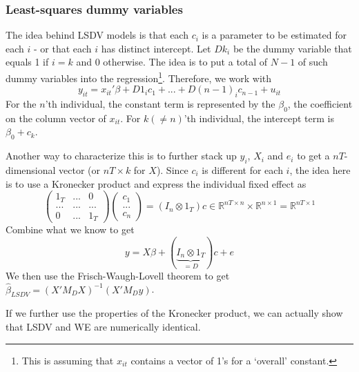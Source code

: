 \documentclass[12pt]{article}
\theoremstyle{definition}
\theoremstyle{property}
\theoremstyle{assumption}
\theoremstyle{example}
\theoremstyle{comment}
\begin{document}
\subsubsection{Least-squares dummy variables}
The idea behind LSDV models is that each $c_i$ is a parameter to be estimated for each $i$ - or that each $i$ has distinct intercept. Let $Dk_i$ be the dummy variable that equals 1 if $i=k$ and 0 otherwise. The idea is to put a total of $N-1$ of such dummy variables into the regression\footnote{This is assuming that $x_{it}$ contains a vector of 1's for a `overall' constant.}. Therefore, we work with
\small{\[
y_{it}=x_{it}'\beta + D1_ic_1+...+D(n-1)_ic_{n-1}+u_{it} 
\]}\normalsize
For the $n$'th individual, the constant term is represented by the $\beta_0$, the coefficient on the column vector of $x_{it}$. For $k(\neq n)$'th individual, the intercept term is $\beta_0 + c_k$. 
\par
Another way to characterize this is to further stack up $y_i$, $X_i$ and $e_i$ to get a $nT$-dimensional vector (or $nT\times k$ for $X$). Since $c_i$ is different for each $i$, the idea here is to use a Kronecker product and express the individual fixed effect as
\[
\begin{pmatrix}1_T &...& 0 \\ ... &...&...\\ 0&...& 1_T \end{pmatrix}\begin{pmatrix}c_1\\ ...\\ c_n \end{pmatrix}=(I_n\otimes 1_T)c\in\mathbb{R}^{nT\times n}\times \mathbb{R}^{n\times 1}=\mathbb{R}^{nT\times 1}
\]
Combine what we know to get 
\[
{y} = {X}\beta+(\underbrace{I_n\otimes 1_T}_{=D})c+{e}
\]
We then use the Frisch-Waugh-Lovell theorem to get $\hat{\beta}_{LSDV}=({X}'M_D{X})^{-1}({X}'M_D{y})$.
\par
If we further use the properties of the Kronecker product, we can actually show that LSDV and WE are numerically identical.
\end{document}
